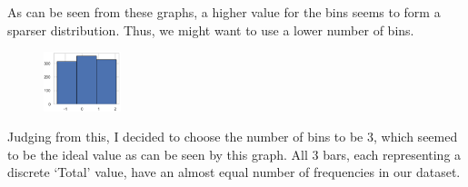 As can be seen from these graphs, a higher value for the bins seems to form a sparser distribution. Thus, we might want to use a lower number of bins.

\begin{figure}[h]
    \centering
    \includegraphics[width=0.2\textwidth]{Chapters/ch9/bar_chart_3.png}
\end{figure}
Judging from this, I decided to choose the number of bins to be 3, which seemed to be the ideal value as can be seen by this graph. All 3 bars, each representing a discrete ‘Total’ value, have an almost equal number of frequencies in our dataset. 


